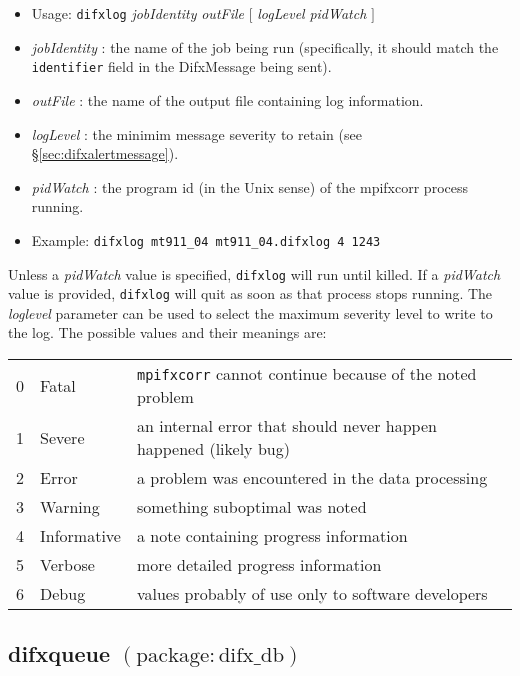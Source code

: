 \begin{itemize}
\item[] Usage: {\tt difxlog} {\em jobIdentity} {\em outFile} $[$ {\em logLevel} {\em pidWatch} $]$ 
\item[] {\em jobIdentity} : the name of the job being run (specifically, it should match the {\tt identifier} field in the DifxMessage being sent).
\item[] {\em outFile} : the name of the output file containing log information.
\item[] {\em logLevel} : the minimim message severity to retain (see \S\ref{sec:difxalertmessage}).
\item[] {\em pidWatch} : the program id (in the Unix sense) of the mpifxcorr process running.
\item[] Example: {\tt difxlog mt911\_04 mt911\_04.difxlog 4 1243}
\end{itemize}

Unless a {\em pidWatch} value is specified, {\tt difxlog} will run until killed.
If a {\em pidWatch} value is provided, {\tt difxlog} will quit as soon as that process stops running.
The {\em loglevel} parameter can be used to select the maximum severity level to write to the log.
The possible values and their meanings are:
\begin{center}
\begin{tabular}{lll}
0 & Fatal & {\tt mpifxcorr} cannot continue because of the noted problem \\
1 & Severe & an internal error that should never happen happened (likely bug) \\
2 & Error & a problem was encountered in the data processing \\
3 & Warning & something suboptimal was noted \\
4 & Informative & a note containing progress information \\
5 & Verbose & more detailed progress information \\
6 & Debug & values probably of use only to software developers \\
\end{tabular}
\end{center}








\subsection{difxqueue {\small $\mathrm{(package: difx\_db)}$}} \label{sec:difxqueue}


